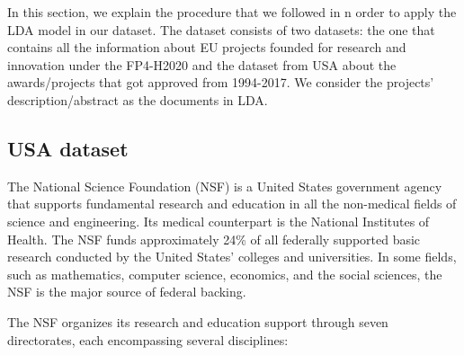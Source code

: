 \documentclass[12pt]{report}
\begin{document}
In this section, we explain the procedure that we followed in n order to apply
the LDA model in our dataset. The dataset consists of two datasets: the one that
contains all the information about EU projects founded for research and
innovation under the FP4-H2020 and the dataset from USA about the
awards/projects that got approved from 1994-2017. We consider the projects'
description/abstract as the documents in LDA. 

\subsection{USA dataset}

The National Science Foundation (NSF) is a United States government agency that
supports fundamental research and education in all the non-medical fields of
science and engineering. Its medical counterpart is the National Institutes of
Health. The NSF funds approximately 24\% of all federally supported basic
research conducted by the United States' colleges and universities. In some
fields, such as mathematics, computer science, economics, and the social
sciences, the NSF is the major source of federal backing.

 
The NSF organizes its research and education support through seven 
directorates, each encompassing several disciplines:
\end{document}
